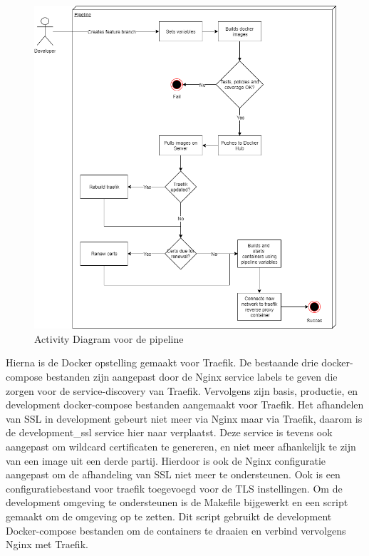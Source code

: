 \begin{figure}[H]
	\centering
	\includegraphics[width=13cm]{Figures/Activitydiagram}
	\decoRule
	\caption[Pipeline Activity Diagram]{Activity Diagram voor de pipeline}
	\label{activitydiagram}
\end{figure}

Hierna is de Docker opstelling gemaakt voor Traefik. De bestaande drie docker-compose bestanden zijn aangepast door de Nginx service labels te geven die zorgen voor de service-discovery van Traefik. Vervolgens zijn basis, productie, en development docker-compose bestanden aangemaakt voor Traefik. Het afhandelen van SSL in development gebeurt niet meer via Nginx maar via Traefik, daarom is de development\_ssl service hier naar verplaatst. Deze service is tevens ook aangepast om wildcard certificaten te genereren, en niet meer afhankelijk te zijn van een image uit een derde partij. Hierdoor is ook de Nginx configuratie aangepast om de afhandeling van SSL niet meer te ondersteunen. Ook is een configuratiebestand voor traefik toegevoegd voor de TLS instellingen. Om de development omgeving te ondersteunen is de Makefile bijgewerkt en een script gemaakt om de omgeving op te zetten. Dit script gebruikt de development Docker-compose bestanden om de containers te draaien en verbind vervolgens Nginx met Traefik.

